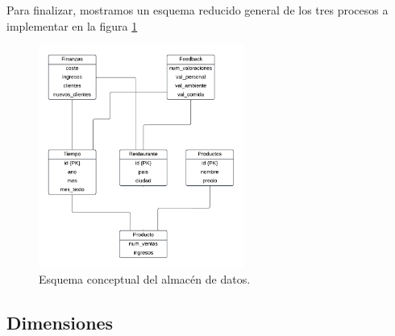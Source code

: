 \documentclass[12pt]{opticajnl}
\begin{document}
Para finalizar, mostramos un esquema reducido general de los tres procesos a implementar en la figura \ref{fig:esquema_almacen}

\begin{figure}[H]
\centering
\includegraphics[width=0.6\textwidth]{fotos/3.pdf}
\caption{Esquema conceptual del almacén de datos.}
\label{fig:esquema_almacen}
\end{figure}


\subsection{Dimensiones}
\end{document}
